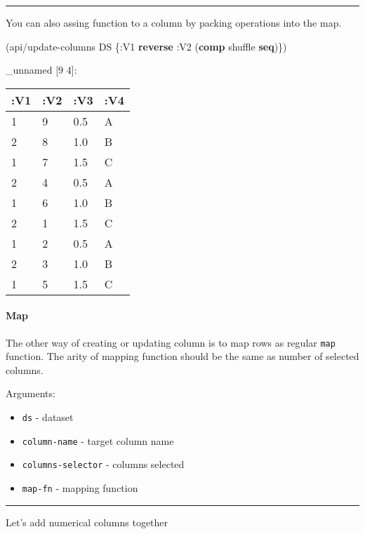 \documentclass[]{article}
\newenvironment{Shaded}{\begin{snugshade}}{\end{snugshade}}
\newcommand{\AttributeTok}[1]{\textcolor[rgb]{0.77,0.63,0.00}{#1}}
\newcommand{\KeywordTok}[1]{\textcolor[rgb]{0.13,0.29,0.53}{\textbf{#1}}}
\newcommand{\NormalTok}[1]{#1}
\providecommand{\tightlist}{%
  \setlength{\itemsep}{0pt}\setlength{\parskip}{0pt}}
\let\oldparagraph\paragraph
\renewcommand{\paragraph}[1]{\oldparagraph{#1}\mbox{}}
\begin{document}
\begin{center}\rule{0.5\linewidth}{0.5pt}\end{center}

You can also assing function to a column by packing operations into the
map.

\begin{Shaded}
\begin{Highlighting}[]
\NormalTok{(api/update-columns DS \{}\AttributeTok{:V1} \KeywordTok{reverse}
                        \AttributeTok{:V2}\NormalTok{ (}\KeywordTok{comp}\NormalTok{ shuffle }\KeywordTok{seq}\NormalTok{)\})}
\end{Highlighting}
\end{Shaded}

\_unnamed {[}9 4{]}:

\begin{longtable}[]{@{}llll@{}}
\toprule
:V1 & :V2 & :V3 & :V4\tabularnewline
\midrule
\endhead
1 & 9 & 0.5 & A\tabularnewline
2 & 8 & 1.0 & B\tabularnewline
1 & 7 & 1.5 & C\tabularnewline
2 & 4 & 0.5 & A\tabularnewline
1 & 6 & 1.0 & B\tabularnewline
2 & 1 & 1.5 & C\tabularnewline
1 & 2 & 0.5 & A\tabularnewline
2 & 3 & 1.0 & B\tabularnewline
1 & 5 & 1.5 & C\tabularnewline
\bottomrule
\end{longtable}

\hypertarget{map}{%
\paragraph{Map}\label{map}}

The other way of creating or updating column is to map rows as regular
\texttt{map} function. The arity of mapping function should be the same
as number of selected columns.

Arguments:

\begin{itemize}
\tightlist
\item
  \texttt{ds} - dataset
\item
  \texttt{column-name} - target column name
\item
  \texttt{columns-selector} - columns selected
\item
  \texttt{map-fn} - mapping function
\end{itemize}

\begin{center}\rule{0.5\linewidth}{0.5pt}\end{center}

Let's add numerical columns together
\end{document}

